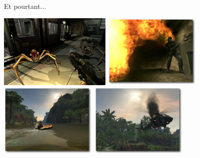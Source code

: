 \begin{frame}[t]{Et pourtant...}
  \begin{center}
    \includegraphics[height=3.6cm]{figs/pourtant1.png}
    \hspace{0.5cm}
    \includegraphics[height=3.6cm]{figs/pourtant2.png} \\
    \includegraphics[height=3.6cm]{figs/pourtant3.png}
    \hspace{0.5cm}
    \includegraphics[height=3.6cm]{figs/pourtant4.png}
  \end{center}
\end{frame}

